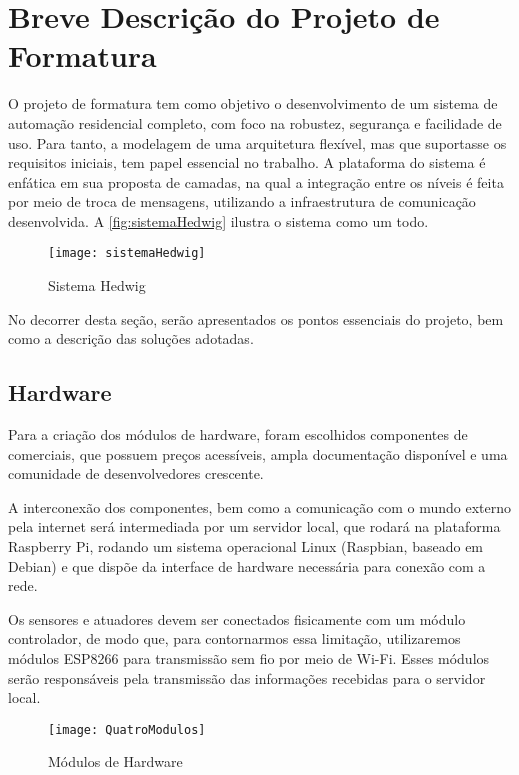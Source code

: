\chapter{Breve Descrição do Projeto de Formatura}

O projeto de formatura tem como objetivo o desenvolvimento de um sistema de automação residencial completo, com foco na robustez, segurança e facilidade de uso. Para tanto, a modelagem de uma arquitetura flexível, mas que suportasse os requisitos iniciais, tem papel essencial no trabalho. A plataforma do sistema é enfática em sua proposta de camadas, na qual a integração entre os níveis é feita por meio de troca de mensagens, utilizando a infraestrutura de comunicação desenvolvida. A \autoref{fig:sistemaHedwig} ilustra o sistema como um todo.

\begin{figure}[H]
	\caption{\label{fig:sistemaHedwig}Sistema Hedwig}
	\begin{center}
		\texttt{[image: sistemaHedwig]}
	\end{center}
\end{figure}

No decorrer desta seção, serão apresentados os pontos essenciais do projeto, bem como a descrição das soluções adotadas.

\section{Hardware}

Para a criação dos módulos de hardware, foram escolhidos componentes de \wiot{} comerciais, que possuem preços acessíveis, ampla documentação disponível e uma comunidade de desenvolvedores crescente.

A interconexão dos componentes, bem como a comunicação com o mundo externo pela internet será intermediada por um servidor local, que rodará na plataforma Raspberry Pi, rodando um sistema operacional Linux (Raspbian, baseado em Debian) e que dispõe da interface de hardware necessária para conexão com a rede.

Os sensores e atuadores devem ser conectados fisicamente com um módulo controlador, de modo que, para contornarmos essa limitação, utilizaremos módulos ESP8266 para transmissão sem fio por meio de Wi-Fi. Esses módulos serão responsáveis pela transmissão das informações recebidas para o servidor local. 

\begin{figure}[H]
	\caption{\label{fig:QuatroModulos}Módulos de Hardware}
	\begin{center}
		\texttt{[image: QuatroModulos]}
	\end{center}
\end{figure}

